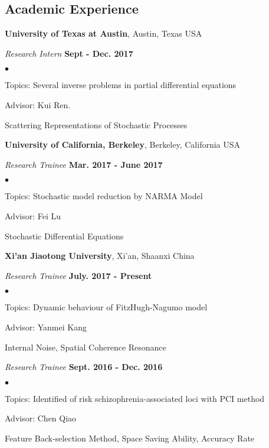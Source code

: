 \documentclass[margin,line]{res}
\newenvironment{list2}{
  \begin{list}{$\bullet$}{%
      \setlength{\itemsep}{0in}
      \setlength{\parsep}{0in} \setlength{\parskip}{0in}
      \setlength{\topsep}{0in} \setlength{\partopsep}{0in} 
      \setlength{\leftmargin}{0.2in}}}{\end{list}}
\begin{document}
\begin{resume}
\section{\sc Academic Experience}

{\bf University of Texas at Austin}, Austin, Texas USA
\vspace{-.3cm}

{\em Research Intern} \hfill {\bf Sept - Dec. 2017}\\
\begin{list2}
\item Topics: Several inverse problems in partial differential equations
\item Advisor: Kui Ren. 
\item Scattering Representations of Stochastic Processes
\end{list2}




{\bf University of California, Berkeley}, Berkeley, California USA

\vspace{-.3cm}
{\em Research Trainee} \hfill {\bf Mar. 2017 - June 2017}\\
\begin{list2}
\item Topics: Stochastic model reduction by NARMA Model
\item Advisor: Fei Lu
\item Stochastic Differential Equations
\end{list2}



{\bf Xi'an Jiaotong University}, Xi'an,  Shaanxi China

\vspace{-.3cm}
{\em Research Trainee} \hfill {\bf July. 2017 - Present}\\
\begin{list2}
\item Topics: Dynamic behaviour of FitzHugh-Nagumo model
\item Advisor: Yanmei Kang
\item Internal Noise, Spatial Coherence Resonance
\end{list2}


{\em Research Trainee} \hfill {\bf Sept. 2016 - Dec. 2016}\\
\begin{list2}
\item Topics: Identified of risk schizophrenia-associated loci with PCI method
\item Advisor: Chen Qiao
\item Feature Back-selection Method, Space Saving Ability, Accuracy Rate
\end{list2}



\end{resume}
\end{document}

